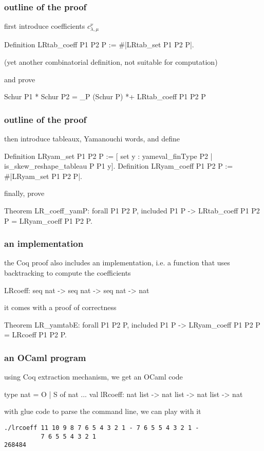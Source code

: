 \documentclass{beamer}
\let\emph\alert
\begin{document}
\begin{frame}[fragile]\frametitle{outline of the proof}
  first introduce coefficients $c_{\lambda, \mu}^{\nu}$
\begin{coq}
Definition LRtab_coeff P1 P2 P :=
  #|LRtab_set P1 P2 P|.
\end{coq}
(yet another combinatorial definition, not suitable for computation)

\bigskip
and prove
\begin{coq}
Schur P1 * Schur P2 =
  \sum_P (Schur P) *+ LRtab_coeff P1 P2 P
\end{coq}
\end{frame}

\begin{frame}[fragile]\frametitle{outline of the proof}
  then introduce tableaux, Yamanouchi words, and define
\begin{coq}
Definition LRyam_set P1 P2 P :=
  [ set y : yameval_finType P2 |
    is_skew_reshape_tableau P P1 y].
Definition LRyam_coeff P1 P2 P :=
  #|LRyam_set P1 P2 P|.
\end{coq}
  finally, prove
\begin{coq}
Theorem LR_coeff_yamP:
  forall P1 P2 P, included P1 P ->
  LRtab_coeff P1 P2 P = LRyam_coeff P1 P2 P.
\end{coq}
\end{frame}

\begin{frame}[fragile]\frametitle{an implementation}
  the Coq proof also includes an \emph{implementation},
  i.e. a function that uses backtracking to compute the coefficients
\begin{coq}
LRcoeff: seq nat -> seq nat -> seq nat -> nat
\end{coq}

\bigskip
it comes with a proof of correctness
\begin{coq}
Theorem LR_yamtabE:
  forall P1 P2 P, included P1 P ->
  LRyam_coeff P1 P2 P = LRcoeff P1 P2 P.
\end{coq}
\end{frame}

\begin{frame}[fragile]\frametitle{an OCaml program}
using Coq extraction mechanism, we get an OCaml code
\begin{ocaml}
type nat = O | S of nat
...
val lRcoeff: nat list -> nat list -> nat list -> nat
\end{ocaml}

\bigskip
with glue code to parse the command line, we can play with it
\begin{verbatim}
./lrcoeff 11 10 9 8 7 6 5 4 3 2 1 - 7 6 5 5 4 3 2 1 -
          7 6 5 5 4 3 2 1
268484
\end{verbatim}
\end{frame}
\end{document}
